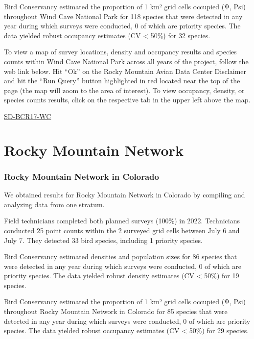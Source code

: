 \documentclass[
  letterpaper,
  DIV=11,
  numbers=noendperiod,
  oneside]{scrreprt}
\begin{document}
Bird Conservancy estimated the proportion of 1 km² grid cells occupied
(Ψ, Psi) throughout Wind Cave National Park for 118 species that were
detected in any year during which surveys were conducted, 0 of which are
priority species. The data yielded robust occupancy estimates (CV
\textless{} 50\%) for 32 species.

To view a map of survey locations, density and occupancy results and
species counts within Wind Cave National Park across all years of the
project, follow the web link below. Hit ``Ok'' on the Rocky Mountain
Avian Data Center Disclaimer and hit the ``Run Query'' button
highlighted in red located near the top of the page (the map will zoom
to the area of interest). To view occupancy, density, or species counts
results, click on the respective tab in the upper left above the map.

\href{http://www.rmbo.org/new_site/adc/QueryWindow.aspx\#N4IgzgLgTghhCuBbEAuABCAygEQLQCEBhAJQEYB2XAdUPSoEsA7AEzUJgDcBTNAOTnoB7RjAA2aAAowoAaxABfIA}{SD-BCR17-WC}

\hypertarget{rocky-mountain-network}{%
\section{Rocky Mountain Network}\label{rocky-mountain-network}}

\hypertarget{rocky-mountain-network-in-colorado}{%
\subsubsection{Rocky Mountain Network in
Colorado}\label{rocky-mountain-network-in-colorado}}

We obtained results for Rocky Mountain Network in Colorado by compiling
and analyzing data from one stratum.

Field technicians completed both planned surveys (100\%) in 2022.
Technicians conducted 25 point counts within the 2 surveyed grid cells
between July 6 and July 7. They detected 33 bird species, including 1
priority species.

Bird Conservancy estimated densities and population sizes for 86 species
that were detected in any year during which surveys were conducted, 0 of
which are priority species. The data yielded robust density estimates
(CV \textless{} 50\%) for 19 species.

Bird Conservancy estimated the proportion of 1 km² grid cells occupied
(Ψ, Psi) throughout Rocky Mountain Network in Colorado for 85 species
that were detected in any year during which surveys were conducted, 0 of
which are priority species. The data yielded robust occupancy estimates
(CV \textless{} 50\%) for 29 species.
\end{document}
